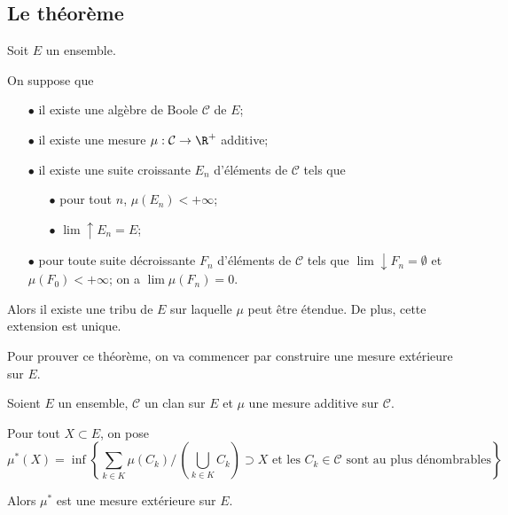 \subsection{Le théorème}

\begin{theo}[Carathéodory]
Soit $E$ un ensemble. 

On suppose que
\begin{itemize}
\item[$\bullet$] il existe une algèbre de Boole $\mathcal{C}$ de $E$;
\item[$\bullet$] il existe une mesure $\mu: \mathcal{C} \to \R^{+}$ additive;
\item[$\bullet$] il existe une suite croissante $E_n$ d'éléments de $\mathcal{C}$ tels que 
\begin{itemize}
\item[$\bullet$] pour tout $n$, $\mu(E_n)< +\infty$;
\item[$\bullet$] $\lim \uparrow E_n = E$; 
\end{itemize}
\item[$\bullet$] pour toute suite décroissante $F_n$ d'éléments de $\mathcal{C}$ tels que $\lim \downarrow F_n = \emptyset$ et $\mu(F_0) < +\infty$; on a $\lim \mu(F_n)=0$.
\end{itemize}

Alors il existe une tribu de $E$ sur laquelle $\mu$ peut être étendue. De plus, cette extension est unique.
\end{theo}

Pour prouver ce théorème, on va commencer par construire une mesure extérieure sur $E$.


\begin{prop}
Soient $E$ un ensemble, $\mathcal{C}$ un clan sur $E$ et $\mu$ une mesure additive sur $\mathcal{C}$.

Pour tout $X \subset E$, on pose 
\[\mu^{*}(X) = \inf\left\{\displaystyle{\sum \limits_{k \in K}}\mu(C_k)/ \, \left(\bigcup \limits_{k \in K} C_k\right) \supset X \text{ et les $C_k \in \mathcal{C}$ sont au plus dénombrables}\right\}\]


Alors $\mu^{*}$ est une mesure extérieure sur $E$.
\end{prop}

